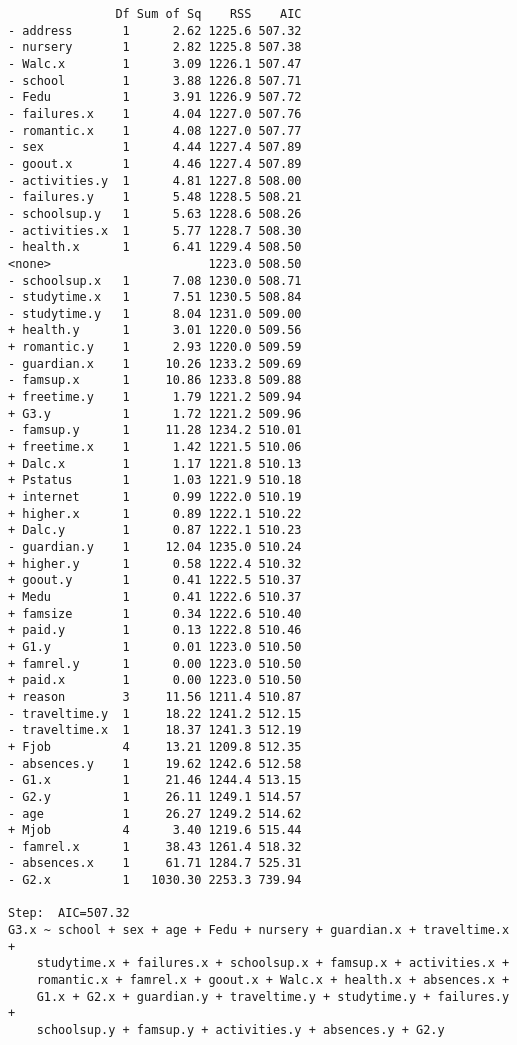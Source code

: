 \documentclass[11pt]{article}
\begin{document}
\begin{enumerate}
\begin{verbatim}
               Df Sum of Sq    RSS    AIC
- address       1      2.62 1225.6 507.32
- nursery       1      2.82 1225.8 507.38
- Walc.x        1      3.09 1226.1 507.47
- school        1      3.88 1226.8 507.71
- Fedu          1      3.91 1226.9 507.72
- failures.x    1      4.04 1227.0 507.76
- romantic.x    1      4.08 1227.0 507.77
- sex           1      4.44 1227.4 507.89
- goout.x       1      4.46 1227.4 507.89
- activities.y  1      4.81 1227.8 508.00
- failures.y    1      5.48 1228.5 508.21
- schoolsup.y   1      5.63 1228.6 508.26
- activities.x  1      5.77 1228.7 508.30
- health.x      1      6.41 1229.4 508.50
<none>                      1223.0 508.50
- schoolsup.x   1      7.08 1230.0 508.71
- studytime.x   1      7.51 1230.5 508.84
- studytime.y   1      8.04 1231.0 509.00
+ health.y      1      3.01 1220.0 509.56
+ romantic.y    1      2.93 1220.0 509.59
- guardian.x    1     10.26 1233.2 509.69
- famsup.x      1     10.86 1233.8 509.88
+ freetime.y    1      1.79 1221.2 509.94
+ G3.y          1      1.72 1221.2 509.96
- famsup.y      1     11.28 1234.2 510.01
+ freetime.x    1      1.42 1221.5 510.06
+ Dalc.x        1      1.17 1221.8 510.13
+ Pstatus       1      1.03 1221.9 510.18
+ internet      1      0.99 1222.0 510.19
+ higher.x      1      0.89 1222.1 510.22
+ Dalc.y        1      0.87 1222.1 510.23
- guardian.y    1     12.04 1235.0 510.24
+ higher.y      1      0.58 1222.4 510.32
+ goout.y       1      0.41 1222.5 510.37
+ Medu          1      0.41 1222.6 510.37
+ famsize       1      0.34 1222.6 510.40
+ paid.y        1      0.13 1222.8 510.46
+ G1.y          1      0.01 1223.0 510.50
+ famrel.y      1      0.00 1223.0 510.50
+ paid.x        1      0.00 1223.0 510.50
+ reason        3     11.56 1211.4 510.87
- traveltime.y  1     18.22 1241.2 512.15
- traveltime.x  1     18.37 1241.3 512.19
+ Fjob          4     13.21 1209.8 512.35
- absences.y    1     19.62 1242.6 512.58
- G1.x          1     21.46 1244.4 513.15
- G2.y          1     26.11 1249.1 514.57
- age           1     26.27 1249.2 514.62
+ Mjob          4      3.40 1219.6 515.44
- famrel.x      1     38.43 1261.4 518.32
- absences.x    1     61.71 1284.7 525.31
- G2.x          1   1030.30 2253.3 739.94

Step:  AIC=507.32
G3.x ~ school + sex + age + Fedu + nursery + guardian.x + traveltime.x + 
    studytime.x + failures.x + schoolsup.x + famsup.x + activities.x + 
    romantic.x + famrel.x + goout.x + Walc.x + health.x + absences.x + 
    G1.x + G2.x + guardian.y + traveltime.y + studytime.y + failures.y + 
    schoolsup.y + famsup.y + activities.y + absences.y + G2.y


\end{verbatim}
\end{enumerate}
\end{document}
